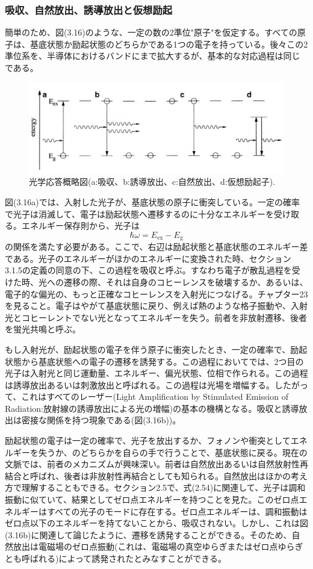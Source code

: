 \documentclass[11pt,a4j,uplatex]{jsarticle}
\begin{document}
\subsubsection{吸収、自然放出、誘導放出と仮想励起}
簡単のため、図(3.16)のような、一定の数の2準位"原子"を仮定する。すべての原子は、基底状態か励起状態のどちらかである1つの電子を持っている。後々この2準位系を、半導体におけるバンドにまで拡大するが、基本的な対応過程は同じである。
\begin{figure}[b]
  \includegraphics[clip]{4way.jpeg}
  \caption{光学応答概略図(a:吸収、b:誘導放出、c:自然放出、d:仮想励起子).}
\end{figure}
図(3.16a)では、入射した光子が、基底状態の原子に衝突している。一定の確率で光子は消滅して、電子は励起状態へ遷移するのに十分なエネルギーを受け取る。エネルギー保存則から、光子は
\begin{equation}
  \hbar\omega=E_{\mathrm{ex}}-E_{\mathrm{g}}\tag{3.36}
\end{equation}
の関係を満たす必要がある。ここで、右辺は励起状態と基底状態のエネルギー差である。光子のエネルギーがほかのエネルギーに変換された時、セクション3.1.5の定義の同意の下、この過程を吸収と呼ぶ。すなわち電子が散乱過程を受けた時、光への遷移の際、それは自身のコヒーレンスを破壊するか、あるいは、電子的な偏光の、もっと正確なコヒーレンスを入射光につなげる。チャプター23を見ること。電子はやがて基底状態に戻り、例えば熱のような格子振動や、入射光とコヒーレントでない光となってエネルギーを失う。前者を非放射遷移、後者を蛍光共鳴と呼ぶ。

もし入射光が、励起状態の電子を伴う原子に衝突したとき、一定の確率で、励起状態から基底状態への電子の遷移を誘発する。この過程においてでは、2つ目の光子は入射光と同じ運動量、エネルギー、偏光状態、位相で作られる。この過程は誘導放出あるいは刺激放出と呼ばれる。この過程は光場を増幅する。したがって、これはすべてのレーザー(Light Amplification by Stimulated Emission of Radiation:放射線の誘導放出による光の増幅)の基本の機構となる。吸収と誘導放出は密接な関係を持つ現象である(図(3.16b))。

励起状態の電子は一定の確率で、光子を放出するか、フォノンや衝突としてエネルギーを失うか、のどちらかを自らの手で行うことで、基底状態に戻る。現在の文脈では、前者のメカニズムが興味深い。前者は自然放出あるいは自然放射性再結合と呼ばれ、後者は非放射性再結合としても知られる。自然放出はほかの考え方で理解することもできる。セクション2.5で、式(2.54)に関連して、光子は調和振動に似ていて、結果としてゼロ点エネルギーを持つことを見た。このゼロ点エネルギーはすべての光子のモードに存在する。ゼロ点エネルギーは、調和振動はゼロ点以下のエネルギーを持てないことから、吸収されない。しかし、これは図(3.16b)に関連して論じたように、遷移を誘発することができる。そのため、自然放出は電磁場のゼロ点振動(これは、電磁場の真空ゆらぎまたはゼロ点ゆらぎとも呼ばれる)によって誘発されたとみなすことができる。
\end{document}
